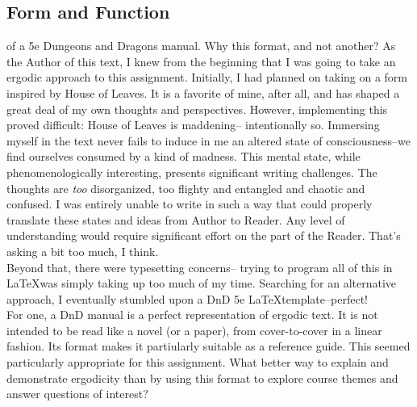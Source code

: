 \documentclass[10pt,twoside,twocolumn,openany,nomultitoc]{book}
\begin{document}
\subsection{Form and Function}
 of a 5e Dungeons and Dragons manual. 
    Why this format, and not another? 
    As the Author of this text, I knew from the beginning that I was going to take an ergodic approach to this assignment. 
    Initially, I had planned on taking on a form inspired by \color{blue}House \color{black} of Leaves. 
    It is a favorite of mine, after all, and has shaped a great deal of my own thoughts and perspectives. 
    However, implementing this proved difficult:  \color{blue}House  \color{black}of Leaves is maddening-- intentionally so.  
    Immersing myself in the text never fails to induce in me an altered state of consciousness--we find ourselves consumed 
    by a kind of madness. This mental state, while phenomenologically interesting, presents significant writing challenges. 
    The thoughts are \textit{too} disorganized, too flighty and entangled and chaotic and confused. 
    I was entirely unable to write in such a way that could properly translate these states and ideas from Author to Reader. 
    Any level of understanding would require significant effort on the part of the Reader. That's asking a bit too much, I think. \\

    Beyond that, there were typesetting concerns-- trying to program all of this in \LaTeX  was simply taking up too much of my time. 
    Searching for an alternative approach, I eventually stumbled upon a DnD 5e  \LaTeX  template--perfect!\\ 

    For one, a DnD manual is a perfect representation of ergodic text. 
    It is not intended to be read like a novel (or a paper), from cover-to-cover in a linear fashion. 
    Its format makes it partiularly suitable as a reference guide. This seemed particularly appropriate for this assignment.  
    What better way to explain and demonstrate ergodicity than by using this format to explore course themes and answer questions of interest?  \\
    
\end{document}
